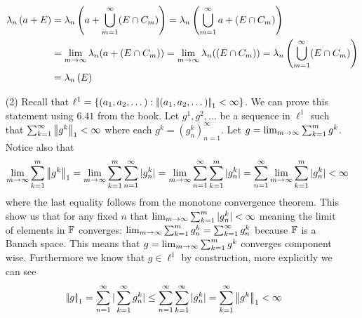 \documentclass[12pt]{amsart}
\DeclareRobustCommand{\rchi}{{\mathpalette\irchi\relax}}
\newcommand{\irchi}[2]{\raisebox{\depth}{$#1\chi$}} %
\begin{document}
\begin{itemize}
   \begin{align*}
      \lambda_n\left(a+E\right)&=\lambda_n\left(a+\bigcup_{m=1}^\infty (E\cap C_m)\right)
   =\lambda_n\left(\bigcup_{m=1}^\infty a+(E\cap C_m)\right)\\
   &=\lim_{m\rightarrow\infty}\lambda_n(a+(E\cap C_m))=\lim_{m\rightarrow\infty}\lambda_n((E\cap C_m))
   =\lambda_n\left(\bigcup_{m=1}^\infty (E\cap C_m)\right)\\
   &=\lambda_n\left(E\right)
\end{align*}


   \iffalse We can prove this by induction. First recall that the Lebesgue 
   measure $\lambda$ for $\R$ is translation invariant.
   Now fix $n>1$ and recall we know that because $\R^n$ with the Lebesgue 
   measure $\lambda_n$ is $\sigma$-finite we know that $\lambda_n$ is the product measure and
   is uniquely defined to be 
   \[\lambda_n(E)=\int_{\R^{n-1}}\int_{\R^{1}}\rchi_{E}(x,y)d\lambda_1(x)d\lambda_{n-1}(y)\]
   Notice that 
   \[\lambda_n(t+E)=\int_{\R^{n-1}}\int_{\R^{1}}\rchi_{t+E}(x,y)d\lambda_1(x)d\lambda_{n-1}(y)
   = \int_{\R^{n-1}}\lambda_1([t+E]^y) d\lambda_{n-1}(y)\]
   And because $\lambda_1$ is translational invariant we know that for any fixed $y\in\R^{n-1}$ that 
   $[t+E]^y\in \R^n$ is Lebesgue measurable, and so $\lambda_1([t+E]^y)$ is measurable function idk\fi



   \item[(2)] %
   Recall that $\ell^1=\{(a_1,a_2,\dots) : \norm{(a_1,a_2,\dots)}_1<\infty \}$. We can prove this 
   statement using $6.41$ from the book. Let $g^1,g^2,\dots $ be a sequence in $\ell^1$ such that 
   $\sum_{k=1}^\infty\norm{g^k}_1<\infty$ where each $g^k=(g^k_n)_{n=1}^\infty$. 
   Let $g=\lim_{m\rightarrow\infty}\sum_{k=1}^m g^k$.
   Notice also that
   \[\lim_{m\ra\infty}\sum_{k=1}^m\norm{g^k}_1=\lim_{m\ra\infty}\sum_{k=1}^m\sum_{n=1}^\infty |g^k_n|
   =\lim_{m\ra\infty}\sum_{n=1}^\infty \sum_{k=1}^m|g^k_n|
   =\sum_{n=1}^\infty \lim_{m\ra\infty}\sum_{k=1}^m|g^k_n|<\infty\]
   where the last equality follows from the monotone convergence theorem. This show us that for any fixed $n$ 
   that $\lim_{m\rightarrow\infty}\sum_{k=1}^m|g^k_n|<\infty$ meaning the limit of elements in 
   $\mathbb{F}$ converges: $\lim_{m\rightarrow\infty}\sum_{k=1}^m g^k_n=\sum_{k=1}^\infty g^k_n$ because $\mathbb{F}$ is a Banach space.
   This means that $g=\lim_{m\rightarrow\infty}\sum_{k=1}^m g^k$ converges component wise. Furthermore we know that $g\in\ell^1$ by construction, more explicitly we can see 
   \[\norm{g}_1=\sum_{n=1}^\infty|\sum_{k=1}^{\infty}g^k_n|\leq\sum_{n=1}^\infty\sum_{k=1}^{\infty}|g^k_n|=\sum_{k=1}^\infty\norm{g^k}_1<\infty\]




\end{itemize}
\end{document}
